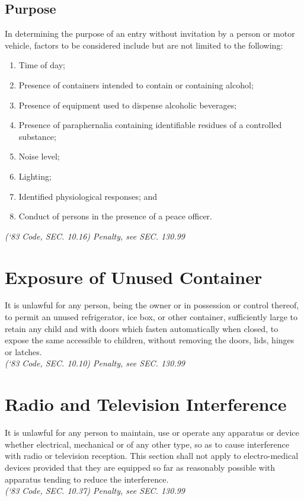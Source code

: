 \subsection{Purpose}
In determining the purpose of an entry without invitation by a person or motor vehicle, factors to be considered include but are not limited to the following:
\begin{enumerate}[{\indent}1)]
    \item Time of day; 
    \item Presence of containers intended to contain or containing alcohol; 
    \item Presence of equipment used to dispense alcoholic beverages; 
    \item Presence of paraphernalia containing identifiable residues of a controlled substance; 
    \item Noise level; 
    \item Lighting; 
    \item Identified physiological responses; and 
    \item Conduct of persons in the presence of a peace officer.
\end{enumerate}
\emph{(‘83 Code, SEC. 10.16)  Penalty, see SEC. 130.99}
\section{Exposure of Unused Container}
It is unlawful for any person, being the owner or in possession or control thereof, to permit an unused refrigerator, ice box, or other container, sufficiently large to retain any child and with doors which fasten automatically when closed, to expose the same accessible to children, without removing the doors, lids, hinges or latches.\\
\emph{(‘83 Code, SEC. 10.10)  Penalty, see SEC. 130.99}
\section{Radio and Television Interference}
It is unlawful for any person to maintain, use or operate any apparatus or device whether electrical, mechanical or of any other type, so as to cause interference with radio or television reception. This section shall not apply to electro-medical devices provided that they are equipped so far as reasonably possible with apparatus tending to reduce the interference.\\
\emph{(‘83 Code, SEC. 10.37)  Penalty, see SEC. 130.99}


